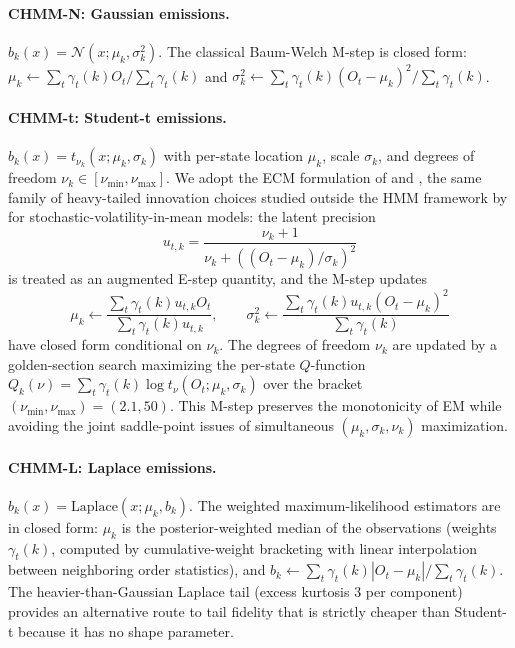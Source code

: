 \paragraph{CHMM-N: Gaussian emissions.}
$b_k(x) = \mathcal{N}(x; \mu_k, \sigma_k^2)$.
The classical Baum-Welch M-step \cite{baum1970maximization} is closed form:
$\mu_k \leftarrow \sum_t \gamma_t(k) O_t / \sum_t \gamma_t(k)$ and
$\sigma_k^2 \leftarrow \sum_t \gamma_t(k) (O_t - \mu_k)^2 / \sum_t \gamma_t(k)$.

\paragraph{CHMM-t: Student-t emissions.}
$b_k(x) = t_{\nu_k}(x; \mu_k, \sigma_k)$ with per-state location $\mu_k$,
scale $\sigma_k$, and degrees of freedom $\nu_k \in [\nu_{\min}, \nu_{\max}]$.
We adopt the ECM formulation of \citet{peel2000robust} and \citet{liu1995ml}, the same family of heavy-tailed innovation choices studied outside the HMM framework by \citet{abantovalle2017svm} for stochastic-volatility-in-mean models:
the latent precision
\begin{equation}
    u_{t,k} = \frac{\nu_k + 1}{\nu_k + ((O_t - \mu_k)/\sigma_k)^2}
    \label{eq:tprecision}
\end{equation}
is treated as an augmented E-step quantity, and the M-step updates
\begin{equation}
    \mu_k \leftarrow \frac{\sum_t \gamma_t(k) u_{t,k} O_t}{\sum_t \gamma_t(k) u_{t,k}},
    \qquad
    \sigma_k^2 \leftarrow \frac{\sum_t \gamma_t(k) u_{t,k} (O_t - \mu_k)^2}{\sum_t \gamma_t(k)}
    \label{eq:tupdate}
\end{equation}
have closed form conditional on $\nu_k$.
The degrees of freedom $\nu_k$ are updated by a golden-section search
maximizing the per-state $Q$-function
$Q_k(\nu) = \sum_t \gamma_t(k) \log t_\nu(O_t; \mu_k, \sigma_k)$
over the bracket $(\nu_{\min}, \nu_{\max}) = (2.1, 50)$.
This M-step preserves the monotonicity of EM while avoiding the joint
saddle-point issues of simultaneous $(\mu_k, \sigma_k, \nu_k)$ maximization.

\paragraph{CHMM-L: Laplace emissions.}
$b_k(x) = \text{Laplace}(x; \mu_k, b_k)$.
The weighted maximum-likelihood estimators are in closed form:
$\mu_k$ is the posterior-weighted median of the observations
(weights $\gamma_t(k)$, computed by cumulative-weight bracketing with
linear interpolation between neighboring order statistics), and
$b_k \leftarrow \sum_t \gamma_t(k) |O_t - \mu_k| / \sum_t \gamma_t(k)$.
The heavier-than-Gaussian Laplace tail (excess kurtosis 3 per component)
provides an alternative route to tail fidelity that is strictly cheaper
than Student-t because it has no shape parameter.

